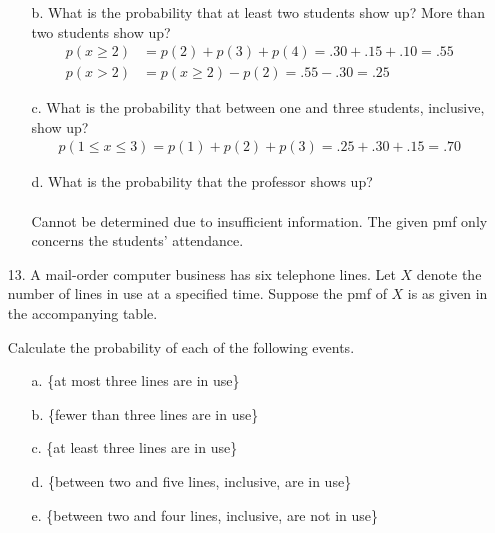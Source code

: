\documentclass[letterpaper,12pt]{article}
\begin{document}
\begin{enumerate}
\begin{enumerate}
\begin{center}
\begin{tikzpicture}
          \end{tikzpicture}
        \end{center}
      \item[b.]
        What is the probability that at least two students show up? More than two students show up?
        \begin{align*}
          p(x \ge 2) &= p(2) + p(3) + p(4) = .30 + .15 + .10 = .55 \\
          p(x > 2) &= p(x \ge 2) - p(2) = .55 - .30 = .25
        \end{align*}
      \item[c.]
        What is the probability that between one and three students, inclusive, show up?
        \begin{align*}
          p(1 \le x \le 3) = p(1) + p(2) + p(3) = .25 + .30 + .15 = .70
        \end{align*}
      \item[d.]
        What is the probability that the professor shows up?
        \\ \\
        Cannot be determined due to insufficient information. The given pmf only concerns the students' attendance.
    \end{enumerate}
  \item[13.]
    A mail-order computer business has six telephone lines. Let $X$ denote the number of lines in use at a specified time. Suppose the pmf of $X$ is as given in the accompanying table.
    \begin{center}
    \end{center}
    Calculate the probability of each of the following events.
    \begin{enumerate}
      \item[a.]
        \{at most three lines are in use\}
      \item[b.]
        \{fewer than three lines are in use\}
      \item[c.]
        \{at least three lines are in use\}
      \item[d.]
        \{between two and five lines, inclusive, are in use\}
      \item[e.]
        \{between two and four lines, inclusive, are not in use\}

\end{enumerate}
\end{enumerate}
\end{document}
